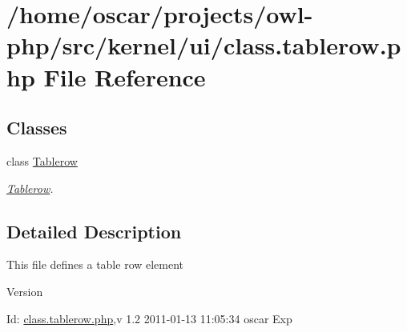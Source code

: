 \section{/home/oscar/projects/owl-\/php/src/kernel/ui/class.tablerow.php File Reference}
\label{class_8tablerow_8php}
\subsection*{Classes}
\begin{DoxyCompactItemize}
\item 
class \hyperlink{classTablerow}{Tablerow}
\begin{DoxyCompactList}\small\item\em \hyperlink{classTablerow}{Tablerow}. \item\end{DoxyCompactList}\end{DoxyCompactItemize}


\subsection{Detailed Description}
This file defines a table row element \begin{DoxyVersion}{Version}

\end{DoxyVersion}
\begin{DoxyParagraph}{Id:}
\hyperlink{class_8tablerow_8php}{class.tablerow.php},v 1.2 2011-\/01-\/13 11:05:34 oscar Exp 
\end{DoxyParagraph}
